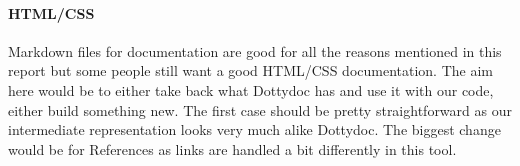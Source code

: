 \documentclass{report}
\begin{document}
\paragraph{HTML/CSS}
Markdown files for documentation are good for all the reasons mentioned in this report but some people still want a good HTML/CSS documentation. The aim here would be to either take back what Dottydoc has and use it with our code, either build something new. The first case should be pretty straightforward as our intermediate representation looks very much alike Dottydoc. The biggest change would be for References as links are handled a bit differently in this tool.
\end{document}
